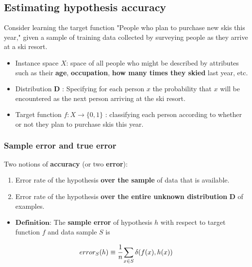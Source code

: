 \hypertarget{estimating-hypothesis-accuracy}{%
\subsection{Estimating hypothesis
accuracy}\label{estimating-hypothesis-accuracy}}

Consider learning the target function "People who plan to purchase new
skis this year," given a sample of training data collected by surveying
people as they arrive at a ski resort.

\begin{itemize}
\item
  Instance space \(X\): space of all people who might be described by
  attributes such as their \textbf{age}, \textbf{occupation},
  \textbf{how many times they skied} last year, etc.
\item
  Distribution \(\boldsymbol{D}\) : Specifying for each person \(x\) the
  probability that \(x\) will be encountered as the next person arriving
  at the ski resort.
\item
  Target function \(f:X\rightarrow\{0,1\}\) : classifying each person
  according to whether or not they plan to purchase skis this year.
\end{itemize}

\hypertarget{sample-error-and-true-error}{%
\subsubsection{Sample error and true
error}\label{sample-error-and-true-error}}

Two notions of \textbf{accuracy} (or two \textbf{error}):

\begin{enumerate}
\def\labelenumi{\arabic{enumi}.}
\item
  Error rate of the hypothesis \textbf{over the sample} of data that is
  available.
\item
  Error rate of the hypothesis \textbf{over the entire unknown
  distribution} \(\boldsymbol{D}\) of examples.
\end{enumerate}

\begin{itemize}
\item
  \(\textbf{Definition}\): The \textbf{sample error} of hypothesis \(h\)
  with respect to target function \(f\) and data sample \(S\) is
\end{itemize}

\[error_S(h)\equiv\cfrac{1}{n}\sum_{x\in S}\delta(f(x),h(x))\]

